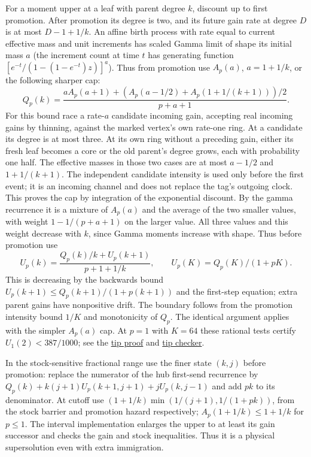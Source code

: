 \documentclass[11pt]{article}
\newcommand{\proofsrc}[2]{\href{https://github.com/uzay-eth/friend-tree-exponent/blob/a0972085ad72ad5685ae7b424988648d1965e73c/#1}{#2}}
\theoremstyle{remark}
\numberwithin{equation}{section}
\begin{document}
For a moment upper at a leaf with parent degree $k$, discount up to first promotion. After promotion its degree is two, and its future gain rate at degree $D$ is at most $D-1+1/k$. An affine birth process with rate equal to current effective mass and unit increments has scaled Gamma limit of shape its initial mass $a$ (the increment count at time $t$ has generating function $[e^{-t}/(1-(1-e^{-t})z)]^a$). Thus from promotion use $A_p(a)$, $a=1+1/k$, or the following sharper cap:
\[
 Q_p(k)=\frac{a A_p(a+1)+(A_p(a-1/2)+A_p(1+1/(k+1)))/2}{p+a+1}.
\]
For this bound race a rate-$a$ candidate incoming gain, accepting real incoming gains by thinning, against the marked vertex's own rate-one ring. At a candidate its degree is at most three. At its own ring without a preceding gain, either its fresh leaf becomes a core or the old parent's degree grows, each with probability one half. The effective masses in those two cases are at most $a-1/2$ and $1+1/(k+1)$. The independent candidate intensity is used only before the first event; it is an incoming channel and does not replace the tag's outgoing clock. This proves the cap by integration of the exponential discount. By the gamma recurrence it is a mixture of $A_p(a)$ and the average of the two smaller values, with weight $1-1/(p+a+1)$ on the larger value. All three values and this weight decrease with $k$, since Gamma moments increase with shape. Thus before promotion use
\[
 U_p(k)=\frac{Q_p(k)/k+U_p(k+1)}{p+1+1/k},
 \qquad U_p(K)=Q_p(K)/(1+pK).
\]
This is decreasing by the backwards bound $U_p(k+1)\le Q_p(k+1)/(1+p(k+1))$ and the first-step equation; extra parent gains have nonpositive drift. The boundary follows from the promotion intensity bound $1/K$ and monotonicity of $Q_p$. The identical argument applies with the simpler $A_p(a)$ cap. At $p=1$ with $K=64$ these rational tests certify $U_1(2)<387/1000$; see the \proofsrc{round2/proofs/astra-late/source/round2/open/age-order/hub-ranking/tip-moments/README.md}{tip proof} and \proofsrc{round2/proofs/astra-late/source/round2/open/age-order/hub-ranking/tip-moments/check.py}{tip checker}.

In the stock-sensitive fractional range use the finer state $(k,j)$ before promotion: replace the numerator of the hub first-send recurrence by $Q_p(k)+k(j+1)U_p(k+1,j+1)+jU_p(k,j-1)$ and add $pk$ to its denominator. At cutoff use $(1+1/k)\min(1/(j+1),1/(1+pk))$, from the stock barrier and promotion hazard respectively; $A_p(1+1/k)\le1+1/k$ for $p\le1$. The interval implementation enlarges the upper to at least its gain successor and checks the gain and stock inequalities. Thus it is a physical supersolution even with extra immigration.
\end{document}
